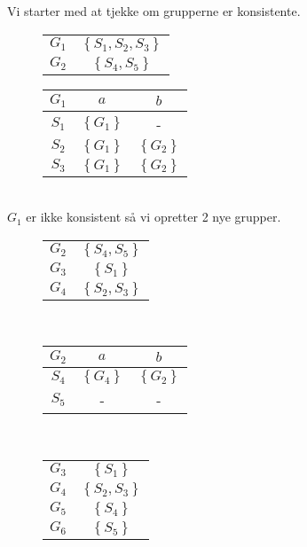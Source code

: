 Vi starter med at tjekke om grupperne er konsistente.
\begin{figure}[!ht]\label{fig:mindfa:gs}
  \centering
  \begin{tabular}{c|c}
    $G_1$ & $\left\{S_1, S_2, S_3\right\}$\\
    $G_2$ & $\left\{S_4, S_5\right\}$
  \end{tabular}
\end{figure}
\begin{figure}[!ht]\label{fig:mindfa:g1}
  \centering
  \begin{tabular}{c|cc}
    $G_1$ & $a$ & $b$\\\hline
    $S_1$ & $\left\{G_1\right\}$ & -\\
    $S_2$ & $\left\{G_1\right\}$ & $\left\{G_2\right\}$\\
    $S_3$ & $\left\{G_1\right\}$ & $\left\{G_2\right\}$
  \end{tabular}
\end{figure}\\
$G_1$ er ikke konsistent så vi opretter 2 nye grupper.
\begin{figure}[!ht]\label{fig:mindfa:newgs}
  \centering
  \begin{tabular}{c|c}
    $G_2$ & $\left\{S_4, S_5\right\}$\\
    $G_3$ & $\left\{S_1\right\}$\\
    $G_4$ & $\left\{S_2, S_3\right\}$
  \end{tabular}
\end{figure}\\
\begin{figure}[!ht]\label{fig:mindfa:g2}
  \centering
  \begin{tabular}{c|cc}
    $G_2$ & $a$ & $b$\\\hline
    $S_4$ & $\left\{G_4\right\}$ & $\left\{G_2\right\}$ \\
    $S_5$ & - & -
  \end{tabular}
\end{figure}\\
\begin{figure}[!ht]\label{fig:mindfa:newgs}
  \centering
  \begin{tabular}{c|c}
    $G_3$ & $\left\{S_1\right\}$\\
    $G_4$ & $\left\{S_2, S_3\right\}$\\
    $G_5$ & $\left\{S_4\right\}$\\
    $G_6$ & $\left\{S_5\right\}$
  \end{tabular}
\end{figure}\\
